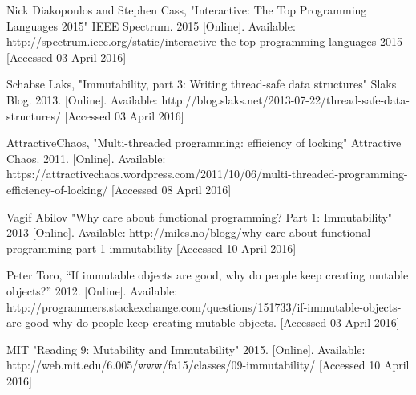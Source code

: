 \documentclass[11pt]{article}
\begin{document}
\begin{thebibliography}{9}

  Nick Diakopoulos and Stephen Cass,
  "Interactive: The Top Programming Languages 2015"
  IEEE Spectrum.
  2015
  [Online].
  Available: http://spectrum.ieee.org/static/interactive-the-top-programming-languages-2015
  [Accessed 03 April 2016]

  Schabse Laks,
  "Immutability, part 3: Writing thread-safe data structures"
  Slaks Blog.
  2013.
  [Online].
  Available: http://blog.slaks.net/2013-07-22/thread-safe-data-structures/
  [Accessed 03 April 2016]

  AttractiveChaos,
  "Multi-threaded programming: efficiency of locking"
  Attractive Chaos.
  2011.
  [Online].
  Available: https://attractivechaos.wordpress.com/2011/10/06/multi-threaded-programming-efficiency-of-locking/
  [Accessed 08 April 2016]

	Vagif Abilov
	"Why care about functional programming? Part 1: Immutability"
	2013
	[Online].
	Available: http://miles.no/blogg/why-care-about-functional-programming-part-1-immutability
	[Accessed 10 April 2016]

	Peter Toro,
	“If immutable objects are good, why do people keep creating mutable objects?”
	2012.
	[Online].
	Available: http://programmers.stackexchange.com/questions/151733/if-immutable-objects-are-good-why-do-people-keep-creating-mutable-objects.
	[Accessed 03 April 2016]

	MIT
	"Reading 9: Mutability and Immutability"
	2015.
	[Online].
	Available: http://web.mit.edu/6.005/www/fa15/classes/09-immutability/
	[Accessed 10 April 2016]

\end{thebibliography}
\end{document}
